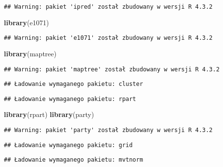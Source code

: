 \documentclass[
]{article}
\newenvironment{Shaded}{\begin{snugshade}}{\end{snugshade}}
\newcommand{\FunctionTok}[1]{\textcolor[rgb]{0.13,0.29,0.53}{\textbf{#1}}}
\newcommand{\NormalTok}[1]{#1}
\begin{document}
\begin{verbatim}
## Warning: pakiet 'ipred' został zbudowany w wersji R 4.3.2
\end{verbatim}

\begin{Shaded}
\begin{Highlighting}[]
\FunctionTok{library}\NormalTok{(e1071)}
\end{Highlighting}
\end{Shaded}

\begin{verbatim}
## Warning: pakiet 'e1071' został zbudowany w wersji R 4.3.2
\end{verbatim}

\begin{Shaded}
\begin{Highlighting}[]
\FunctionTok{library}\NormalTok{(maptree)}
\end{Highlighting}
\end{Shaded}

\begin{verbatim}
## Warning: pakiet 'maptree' został zbudowany w wersji R 4.3.2
\end{verbatim}

\begin{verbatim}
## Ładowanie wymaganego pakietu: cluster
\end{verbatim}

\begin{verbatim}
## Ładowanie wymaganego pakietu: rpart
\end{verbatim}

\begin{Shaded}
\begin{Highlighting}[]
\FunctionTok{library}\NormalTok{(rpart)}
\FunctionTok{library}\NormalTok{(party)}
\end{Highlighting}
\end{Shaded}

\begin{verbatim}
## Warning: pakiet 'party' został zbudowany w wersji R 4.3.2
\end{verbatim}

\begin{verbatim}
## Ładowanie wymaganego pakietu: grid
\end{verbatim}

\begin{verbatim}
## Ładowanie wymaganego pakietu: mvtnorm
\end{verbatim}
\end{document}
